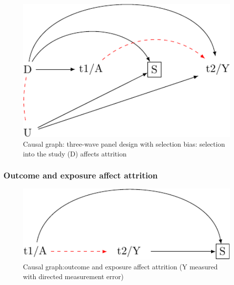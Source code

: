 \documentclass[
  singlecolumn]{report}
\begin{document}
\begin{figure}

{\centering \includegraphics[width=1\textwidth,height=\textheight]{causal-dags_files/figure-pdf/fig-dag-8-4-1.pdf}

}

\caption{\label{fig-dag-8-4}Causal graph: three-wave panel design with
selection bias: selection into the study (D) affects attrition}

\end{figure}

\hypertarget{outcome-and-exposure-affect-attrition}{%
\subsubsection{Outcome and exposure affect
attrition}\label{outcome-and-exposure-affect-attrition}}

\begin{figure}

{\centering \includegraphics[width=1\textwidth,height=\textheight]{causal-dags_files/figure-pdf/fig-dag-8-5-1.pdf}

}

\caption{\label{fig-dag-8-5}Causal graph:outcome and exposure affect
attrition (Y measured with directed measurement error)}

\end{figure}
\end{document}
